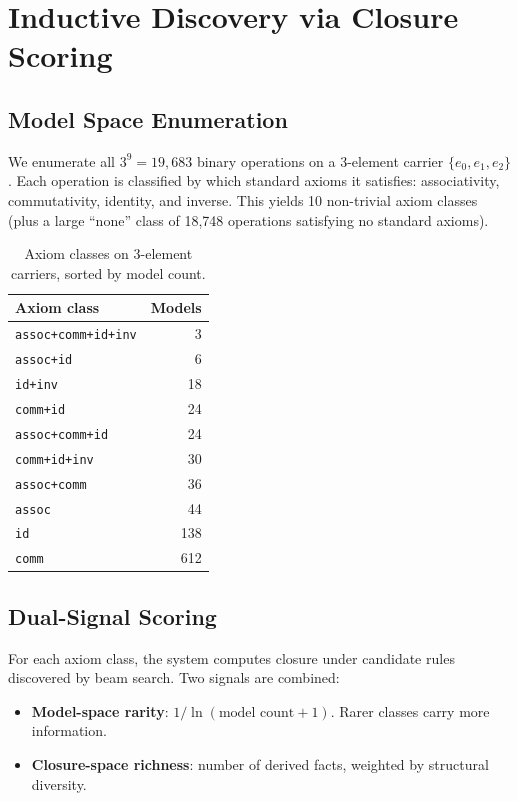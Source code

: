 \section{Inductive Discovery via Closure Scoring}
\label{sec:inductive}

\subsection{Model Space Enumeration}

We enumerate all $3^9 = 19{,}683$ binary operations on a 3-element carrier $\{e_0, e_1, e_2\}$. Each operation is classified by which standard axioms it satisfies: associativity, commutativity, identity, and inverse. This yields 10 non-trivial axiom classes (plus a large ``none'' class of 18{,}748 operations satisfying no standard axioms).

\begin{table}[h]
\centering
\caption{Axiom classes on 3-element carriers, sorted by model count.}
\label{tab:axiom-classes}
\begin{tabular}{lr}
\toprule
Axiom class & Models \\
\midrule
\texttt{assoc+comm+id+inv} & 3 \\
\texttt{assoc+id} & 6 \\
\texttt{id+inv} & 18 \\
\texttt{comm+id} & 24 \\
\texttt{assoc+comm+id} & 24 \\
\texttt{comm+id+inv} & 30 \\
\texttt{assoc+comm} & 36 \\
\texttt{assoc} & 44 \\
\texttt{id} & 138 \\
\texttt{comm} & 612 \\
\bottomrule
\end{tabular}
\end{table}

\subsection{Dual-Signal Scoring}

For each axiom class, the system computes closure under candidate rules discovered by beam search. Two signals are combined:

\begin{itemize}
\item \textbf{Model-space rarity}: $1 / \ln(\text{model count} + 1)$. Rarer classes carry more information.
\item \textbf{Closure-space richness}: number of derived facts, weighted by structural diversity.
\end{itemize}

